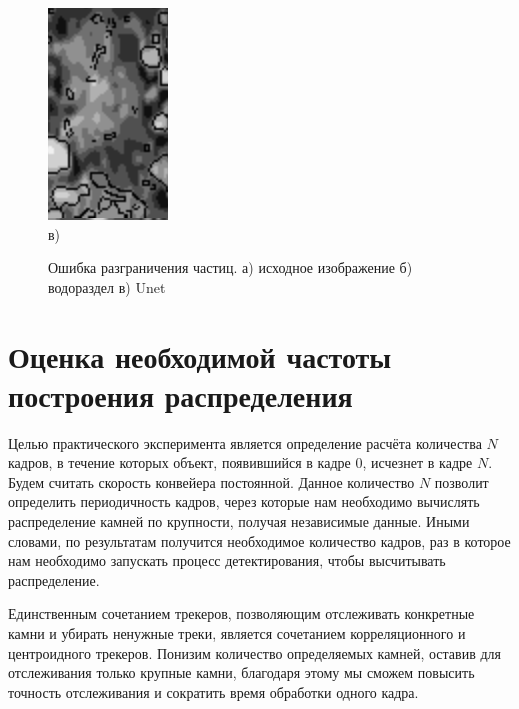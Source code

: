 \documentclass[times]{itmo-student-thesis}
\begin{document}
\begin{figure}[h!]
\begin{minipage}[h]{0.3\linewidth}
	\end{minipage}
	\hfill
	\begin{minipage}[h]{0.3\linewidth}
		\centering
		\includegraphics[width=0.5\linewidth]{images/unets} \\в)
	\end{minipage}
	\caption{Ошибка разграничения частиц. а) исходное изображение б) водораздел в) Unet}
	\label{fig:razgrl}
\end{figure}


\section{Оценка необходимой частоты построения распределения}
Целью практического эксперимента является определение расчёта количества $N$ кадров, в течение которых объект, появившийся в кадре $0$, исчезнет в кадре $N$. Будем считать скорость конвейера постоянной. Данное количество $N$  позволит определить периодичность кадров, через которые нам необходимо вычислять распределение камней по крупности, получая независимые данные. Иными словами, по результатам получится необходимое количество кадров, раз в которое нам необходимо запускать процесс детектирования, чтобы высчитывать распределение.

Единственным сочетанием трекеров, позволяющим отслеживать конкретные камни и убирать ненужные треки, является сочетанием корреляционного и центроидного трекеров. Понизим количество определяемых камней, оставив для отслеживания только крупные камни, благодаря этому мы сможем повысить точность отслеживания и сократить время обработки одного кадра.
\end{document}

